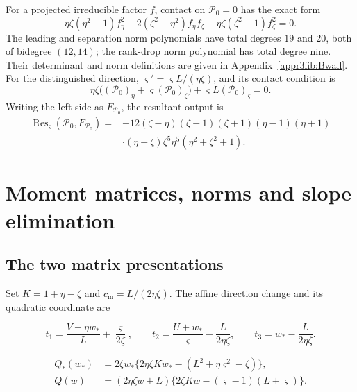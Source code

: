 For a projected irreducible factor $f$, contact on
$\mathcal P_0=0$ has the exact form
\[
 \eta\zeta(\eta^2-1)f_\eta^2
 -2(\zeta^2-\eta^2)f_\eta f_\zeta
 -\eta\zeta(\zeta^2-1)f_\zeta^2=0.
\]
The leading and separation norm polynomials have total degrees $19$
and $20$, both of bidegree $(12,14)$; the rank-drop norm polynomial
has total degree nine. Their determinant and norm definitions are
given in Appendix~\ref{appr3fib:Bwall}.
For the distinguished direction,
$\varsigma'=\varsigma L/(\eta\zeta)$, and its contact condition is
\[
 \eta\zeta\bigl((\mathcal P_0)_\eta+
   \varsigma(\mathcal P_0)_\zeta\bigr)
   +\varsigma L(\mathcal P_0)_\varsigma=0.
\]
Writing the left side as $F_{\mathcal P_0}$, the resultant output is
\[
\begin{aligned}
 \operatorname{Res}_\varsigma(\mathcal P_0,F_{\mathcal P_0})
 ={}&-12(\zeta-\eta)(\zeta-1)(\zeta+1)(\eta-1)(\eta+1)\\
 &\cdot(\eta+\zeta)\zeta^5\eta^5(\eta^2+\zeta^2+1).
\end{aligned}
\]

\clearpage
\section{Moment matrices, norms and slope elimination}\label{supp:elimination}

\subsection{The two matrix presentations}

Set $K=1+\eta-\zeta$ and $c_{\mathrm m}=L/(2\eta\zeta)$.
The affine direction change and its quadratic coordinate are

\begin{equation}\label{supp:r3:momentcoordinates}
 t_1=\frac{V-\eta w_*}{L}+\frac{\varsigma }{2\zeta },\qquad
 t_2=\frac{U+w_*}{\varsigma }-\frac{L}{2\eta \zeta },\qquad
 t_3=w_*-\frac{L}{2\eta \zeta }.
\end{equation}

\begin{equation}\label{supp:r3:momentquadratics}
\begin{aligned}
 Q_*(w_*)&=2\zeta w_*\{2\eta \zeta Kw_*-(L^2+\eta \varsigma ^2-\zeta )\},\\
 Q(w)&=(2\eta \zeta w+L)\{2\zeta Kw-(\varsigma -1)(L+\varsigma )\}.
\end{aligned}
\end{equation}

